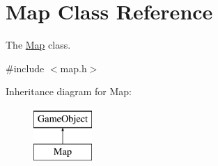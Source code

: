 \hypertarget{class_map}{}\section{Map Class Reference}
\label{class_map}


The \hyperlink{class_map}{Map} class.  




{\ttfamily \#include $<$map.\+h$>$}

Inheritance diagram for Map\+:\begin{figure}[H]
\begin{center}
\leavevmode
\includegraphics[height=2.000000cm]{class_map}
\end{center}
\end{figure}
